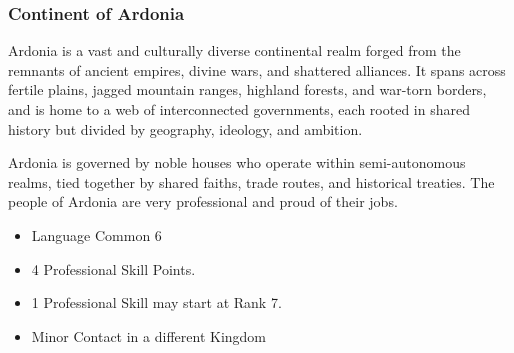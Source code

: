 \subsubsection{Continent of Ardonia}

Ardonia is a vast and culturally diverse continental realm forged from the remnants of ancient empires, divine wars, and shattered alliances. It spans across fertile plains, jagged mountain ranges, highland forests, and war-torn borders, and is home to a web of interconnected governments, each rooted in shared history but divided by geography, ideology, and ambition.

Ardonia is governed by noble houses who operate within semi-autonomous realms, tied together by shared faiths, trade routes, and historical treaties. The people of Ardonia are very professional and proud of their jobs.

\begin{itemize}
\item Language Common 6
\item 4 Professional Skill Points.
\item 1 Professional Skill may start at Rank 7.
\item Minor Contact in a different Kingdom
\end{itemize}





